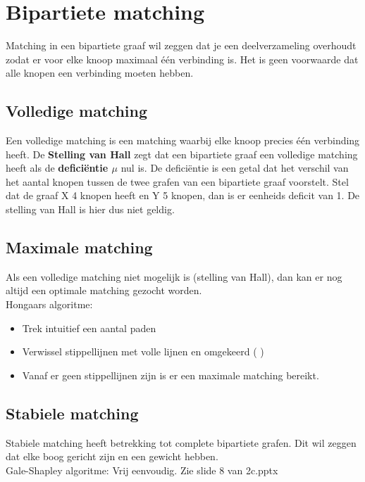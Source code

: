 \documentclass[12pt]{report}
\newcommand{\todo}[1] {
\color{red}\textunderscore{\textit{TODO: #1}}
\color{black}
}
\newcommand{\important}[1] {\textbf{\color{orange}#1}}
\begin{document}
\section{Bipartiete matching}
Matching in een bipartiete graaf wil zeggen dat je een deelverzameling overhoudt zodat er voor elke knoop maximaal één verbinding is. Het is geen
voorwaarde dat alle knopen een verbinding moeten hebben.
\subsection{Volledige matching}
Een volledige matching is een matching waarbij elke knoop precies één verbinding heeft. De \important{Stelling van Hall} zegt dat een 
bipartiete graaf een volledige matching heeft als de \important{deficiëntie $\mu$} nul is. De deficiëntie is een getal dat het verschil
van het aantal knopen tussen de twee grafen van een bipartiete graaf voorstelt. Stel dat de graaf X 4 knopen heeft en Y 5 knopen, dan is er eenheids 
deficit van 1. De stelling van Hall is hier dus niet geldig.

\subsection{Maximale matching}
Als een volledige matching niet mogelijk is (stelling van Hall), dan kan er nog altijd een optimale matching gezocht worden.
\\
Hongaars algoritme:
\begin{itemize}
 \item Trek intuitief een aantal paden
 \item Verwissel stippellijnen met volle lijnen en omgekeerd (\todo{wtf})
 \item Vanaf er geen stippellijnen zijn is er een maximale matching bereikt.
\end{itemize}

\subsection{Stabiele matching}
Stabiele matching heeft betrekking tot complete bipartiete grafen. Dit wil zeggen dat elke boog gericht zijn en een gewicht hebben.
\\
Gale-Shapley algoritme: Vrij eenvoudig. Zie slide 8 van 2c.pptx




\label{ch:groepen}
\end{document}
